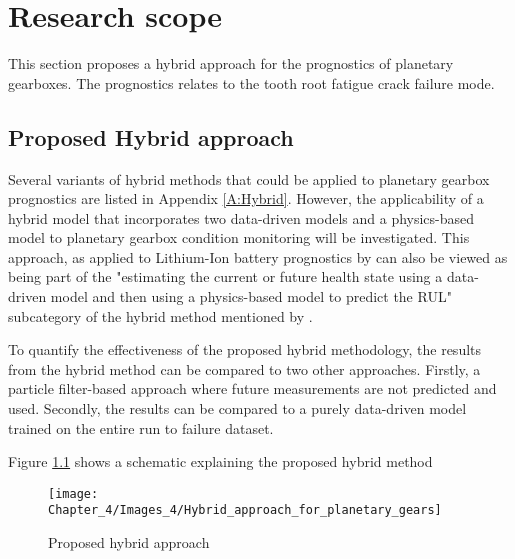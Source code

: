 

\chapter{Research scope} \label{S:Scope}

This section proposes a hybrid approach for the prognostics of planetary gearboxes. The prognostics relates to the tooth root fatigue crack failure mode. 

\section{Proposed Hybrid approach}

Several variants of hybrid methods that could be applied to planetary gearbox prognostics are listed in Appendix \ref{A:Hybrid}. However, the applicability of a hybrid model that incorporates two data-driven models and a physics-based model to planetary gearbox condition monitoring will be investigated. This approach, as applied to Lithium-Ion battery prognostics by \cite{Liao2016} can also be viewed as being part of the "estimating the current or future health state using a data-driven model and then using a physics-based model to predict the RUL" subcategory of the hybrid method mentioned by \cite{Xia2018}.

To quantify the effectiveness of the proposed hybrid methodology, the results from the hybrid method can be compared to two other approaches. Firstly, a particle filter-based approach where future measurements are not predicted and used. Secondly, the results can be compared to a purely data-driven model trained on the entire run to failure dataset. 

Figure \ref{F:Hybrid} shows a schematic explaining the proposed hybrid method

\begin{figure}[H]
	\centering
	\hspace*{-1cm}   
	\texttt{[image: Chapter\_4/Images\_4/Hybrid\_approach\_for\_planetary\_gears]}
	\caption{Proposed hybrid approach}
	\label{F:Hybrid}
\end{figure}

